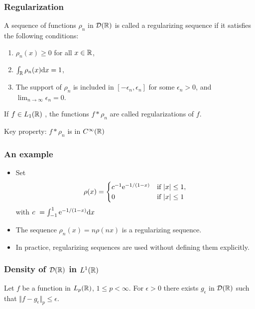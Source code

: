 

\begin{frame}
\frametitle{Regularization}
\begin{definition}
A sequence of functions $\rho_{n}$ in $\mathcal{D}(\mathbb{R})$  is called a regularizing sequence if it satisfies the following conditions:
\begin{enumerate}[label=(\roman*)]
\item $\rho_{n}(x)\geq 0$ for all $ x\in \mathbb{R}$,
\item $\int_{\mathbb{R}}\rho_{n}(x) \mathrm{d} x=1$,
\item The support of $\rho_{n}$ is included in $[-\epsilon_{n},\epsilon_{n}]$ for some $\epsilon_{n}>0$, and $\lim_{n\rightarrow\infty}\epsilon_{n}=0$.
\end{enumerate}
\end{definition}
\begin{definition}
If $ f\in L_1(\mathbb{R})$ , the functions $f*\rho_{n}$ are called \alert{regularizations} of $f$.
\end{definition}
\alert{Key property:} $f*\rho_{n}$ is in $C^{\infty}(\mathbb{R})$
\end{frame}

\begin{frame}
\frametitle{An example}
\begin{itemize}
\item Set
$$\rho(x)=
\begin{cases}
c^{-1} \mathrm{e}^{-1/(1-x)} &  \text{if $|x|\leq 1$},\\
0 & \text{if $|x|\leq 1$}
\end{cases}
$$
with $c\ =\int_{-1}^{1} \mathrm{e}^{-1/(1-x)} \mathrm{d} x$
\item The sequence $\rho_{n}(x)=n\rho(nx)$ is a \alert{regularizing sequence}.
\item In practice, regularizing sequences are used without defining them explicitly.
\end{itemize}
\end{frame}

\begin{frame}
\frametitle{Density of $\mathcal{D}(\mathbb{R})$ in $L^{1}(\mathbb{R})$}
\begin{theorem}
Let $f$ be a function in $L_{p}(\mathbb{R})$, $1 \leq p < \infty$. For $\epsilon>0$ there exists $g_\epsilon$ in $\mathcal{D}(\mathbb{R})$ such that $\Vert f-g_{\epsilon}\Vert_{p}\leq\epsilon$.
\end{theorem}
\end{frame}

